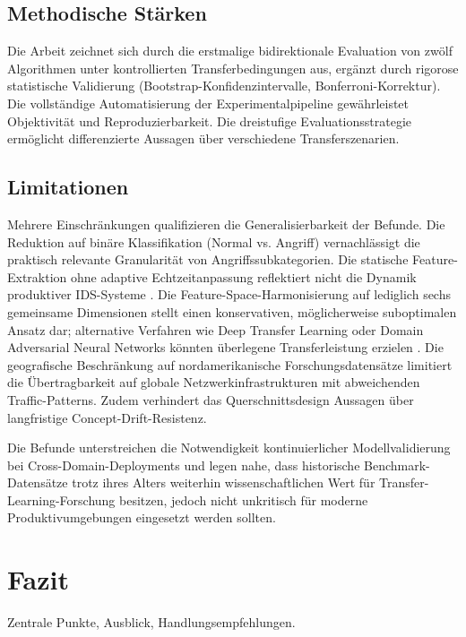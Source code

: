 \documentclass[11pt,a4paper]{article}
\begin{document}
    \subsection{Methodische Stärken}

    Die Arbeit zeichnet sich durch die erstmalige bidirektionale Evaluation von zwölf Algorithmen unter kontrollierten Transferbedingungen aus, ergänzt durch rigorose statistische Validierung (Bootstrap-Konfidenzintervalle, Bonferroni-Korrektur). Die vollständige Automatisierung der Experimentalpipeline gewährleistet Objektivität und Reproduzierbarkeit. Die dreistufige Evaluationsstrategie ermöglicht differenzierte Aussagen über verschiedene Transferszenarien.

    \subsection{Limitationen}

    Mehrere Einschränkungen qualifizieren die Generalisierbarkeit der Befunde. Die Reduktion auf binäre Klassifikation (Normal vs. Angriff) vernachlässigt die praktisch relevante Granularität von Angriffssubkategorien. Die statische Feature-Extraktion ohne adaptive Echtzeitanpassung reflektiert nicht die Dynamik produktiver IDS-Systeme \parencite{Vinayakumar2019}. Die Feature-Space-Harmonisierung auf lediglich sechs gemeinsame Dimensionen stellt einen konservativen, möglicherweise suboptimalen Ansatz dar; alternative Verfahren wie Deep Transfer Learning oder Domain Adversarial Neural Networks könnten überlegene Transferleistung erzielen \parencite{Goodfellow2016}. Die geografische Beschränkung auf nordamerikanische Forschungsdatensätze limitiert die Übertragbarkeit auf globale Netzwerkinfrastrukturen mit abweichenden Traffic-Patterns. Zudem verhindert das Querschnittsdesign Aussagen über langfristige Concept-Drift-Resistenz.

    Die Befunde unterstreichen die Notwendigkeit kontinuierlicher Modellvalidierung bei Cross-Domain-Deployments und legen nahe, dass historische Benchmark-Datensätze trotz ihres Alters weiterhin wissenschaftlichen Wert für Transfer-Learning-Forschung besitzen, jedoch nicht unkritisch für moderne Produktivumgebungen eingesetzt werden sollten.

    \section{Fazit}
    Zentrale Punkte, Ausblick, Handlungsempfehlungen.
\end{document}
